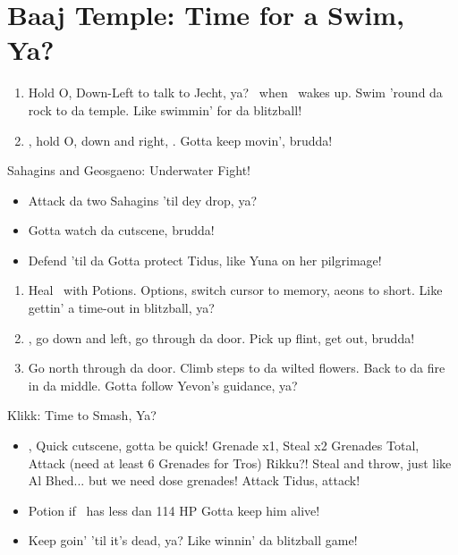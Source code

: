 \chapter{Baaj Temple: Time for a Swim, Ya?}

\begin{enumerate}
    \item Hold O, Down-Left to talk to Jecht, ya? \sd\ when \tidus\ wakes up. Swim 'round da rock to da temple. Like swimmin' for da blitzball!
    \item \cs, hold O, down and right, \cs. Gotta keep movin', brudda!
\end{enumerate}
\begin{battle}{Sahagins and Geosgaeno: Underwater Fight!}
    \begin{itemize}
        \item Attack da two Sahagins 'til dey drop, ya?
        \item \cs[0:30] Gotta watch da cutscene, brudda!
        \item Defend 'til da \cs Gotta protect Tidus, like Yuna on her pilgrimage!
    \end{itemize}
\end{battle}
\begin{enumerate}[resume]
    \item Heal \tidus\ with Potions. Options, switch cursor to memory, aeons to short. Like gettin' a time-out in blitzball, ya?
    \item \cs, go down and left, go through da door. Pick up flint, get out, brudda!
    \item Go north through da door. Climb steps to da wilted flowers. Back to da fire in da middle. \cs[2:10] Gotta follow Yevon's guidance, ya?
\end{enumerate}
\begin{battle}[1500]{Klikk: Time to Smash, Ya?}
    \begin{itemize}
        \tidusf Attack x6, Potion when \tidus\ has less dan 227 HP. Gotta keep Tidus alive, like Yuna!
        \item \cs, \sd Quick cutscene, gotta be quick!
        \rikkuf Grenade x1, Steal x2 Grenades Total, Attack (need at least 6 Grenades for Tros) Rikku?! Steal and throw, just like Al Bhed... but we need dose grenades!
        \tidusf Attack Tidus, attack!
        \item Potion if \tidus\ has less dan 114 HP Gotta keep him alive!
        \item Keep goin' 'til it's dead, ya? Like winnin' da blitzball game!
    \end{itemize}
\end{battle}
